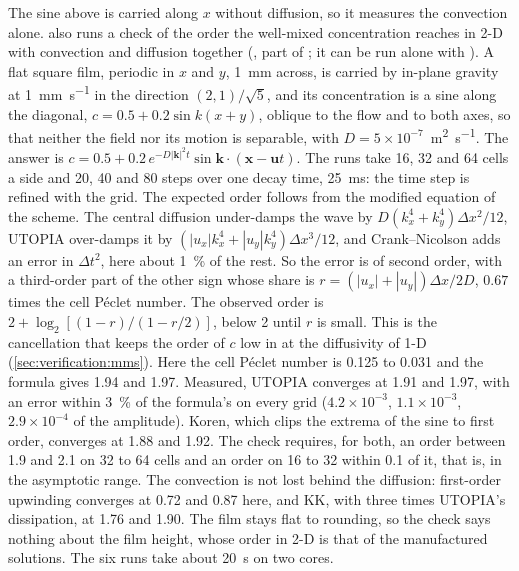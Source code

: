 The sine above is carried along $x$ without diffusion, so it measures the
convection alone.  also runs a check of the order
the well-mixed concentration reaches in 2-D with convection and diffusion
together (, part of ; it can be run alone
with ). A flat square film, periodic in $x$ and $y$,
\SI{1}{\milli\metre} across, is carried by in-plane gravity at
\SI{1}{\milli\metre\per\second} in the direction $(2,1)/\sqrt5$, and its
concentration is a sine along the diagonal, $c = 0.5 + 0.2\sin k(x+y)$,
oblique to the flow and to both axes, so that neither the field nor its
motion is separable, with $D = 5\times10^{-7}$~\si{\metre\squared\per\second}.
The answer is $c = 0.5 + 0.2\,e^{-D|\mathbf k|^2t}\sin\mathbf
k\cdot(\mathbf x - \mathbf u t)$. The runs take 16, 32 and 64 cells a side
and 20, 40 and 80 steps over one decay time, \SI{25}{\milli\second}: the
time step is refined with the grid. The expected order follows from the
modified equation of the scheme. The central diffusion under-damps the wave
by $D(k_x^4+k_y^4)\Delta x^2/12$, UTOPIA over-damps it by
$(|u_x|k_x^4+|u_y|k_y^4)\Delta x^3/12$, and Crank--Nicolson adds an error in
$\Delta t^2$, here about \SI{1}{\percent} of the rest. So the error is of
second order, with a third-order part of the other sign whose share is
$r = (|u_x|+|u_y|)\Delta x/2D$, $0.67$ times the cell Péclet number. The
observed order is $2 + \log_2[(1-r)/(1-r/2)]$, below 2 until $r$ is
small. This is the cancellation that keeps the order of $c$ low in
 at the diffusivity of 1-D (\cref{sec:verification:mms}).
Here the cell Péclet number is 0.125 to 0.031 and the formula gives 1.94
and 1.97. Measured, UTOPIA converges at 1.91 and 1.97, with an error within
\SI{3}{\percent} of the formula's on every grid ($4.2\times10^{-3}$,
$1.1\times10^{-3}$, $2.9\times10^{-4}$ of the amplitude). Koren, which clips
the extrema of the sine to first order, converges at 1.88 and 1.92. The
check requires, for both, an order between 1.9 and 2.1 on 32 to 64 cells and
an order on 16 to 32 within 0.1 of it, that is, in the asymptotic range. The
convection is not lost behind the diffusion: first-order upwinding converges
at 0.72 and 0.87 here, and KK, with three times UTOPIA's dissipation, at
1.76 and 1.90. The film stays flat to rounding, so the check says nothing
about the film height, whose order in 2-D is that of the manufactured
solutions. The six runs take about \SI{20}{\second} on two cores.

